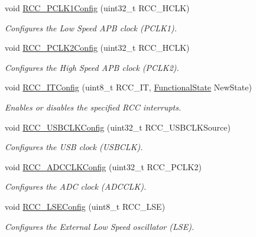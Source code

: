 \begin{DoxyCompactItemize}
void \mbox{\hyperlink{group___r_c_c___private___functions_ga448137346d4292985d4e7a61dd1a824f}{R\+C\+C\+\_\+\+P\+C\+L\+K1\+Config}} (uint32\+\_\+t R\+C\+C\+\_\+\+H\+C\+LK)
\begin{DoxyCompactList}\small\item\em Configures the Low Speed A\+PB clock (P\+C\+L\+K1). \end{DoxyCompactList}\item 
void \mbox{\hyperlink{group___r_c_c___private___functions_ga09f9c010a4adca9e036da42c2ca6126a}{R\+C\+C\+\_\+\+P\+C\+L\+K2\+Config}} (uint32\+\_\+t R\+C\+C\+\_\+\+H\+C\+LK)
\begin{DoxyCompactList}\small\item\em Configures the High Speed A\+PB clock (P\+C\+L\+K2). \end{DoxyCompactList}\item 
void \mbox{\hyperlink{group___r_c_c___private___functions_gaa953aa226e9ce45300d535941e4dfe2f}{R\+C\+C\+\_\+\+I\+T\+Config}} (uint8\+\_\+t R\+C\+C\+\_\+\+IT, \mbox{\hyperlink{group___exported__types_gac9a7e9a35d2513ec15c3b537aaa4fba1}{Functional\+State}} New\+State)
\begin{DoxyCompactList}\small\item\em Enables or disables the specified R\+CC interrupts. \end{DoxyCompactList}\item 
void \mbox{\hyperlink{group___r_c_c___private___functions_ga895b3ff3d143c990f1cd0146aa260081}{R\+C\+C\+\_\+\+U\+S\+B\+C\+L\+K\+Config}} (uint32\+\_\+t R\+C\+C\+\_\+\+U\+S\+B\+C\+L\+K\+Source)
\begin{DoxyCompactList}\small\item\em Configures the U\+SB clock (U\+S\+B\+C\+LK). \end{DoxyCompactList}\item 
void \mbox{\hyperlink{group___r_c_c___private___functions_gadda89cdb838bf49e5fa10f3f774530a4}{R\+C\+C\+\_\+\+A\+D\+C\+C\+L\+K\+Config}} (uint32\+\_\+t R\+C\+C\+\_\+\+P\+C\+L\+K2)
\begin{DoxyCompactList}\small\item\em Configures the A\+DC clock (A\+D\+C\+C\+LK). \end{DoxyCompactList}\item 
void \mbox{\hyperlink{group___r_c_c___private___functions_ga65209ab5c3589b249c7d70f978735ca6}{R\+C\+C\+\_\+\+L\+S\+E\+Config}} (uint8\+\_\+t R\+C\+C\+\_\+\+L\+SE)
\begin{DoxyCompactList}\small\item\em Configures the External Low Speed oscillator (L\+SE). \end{DoxyCompactList}\item 

\end{DoxyCompactItemize}
